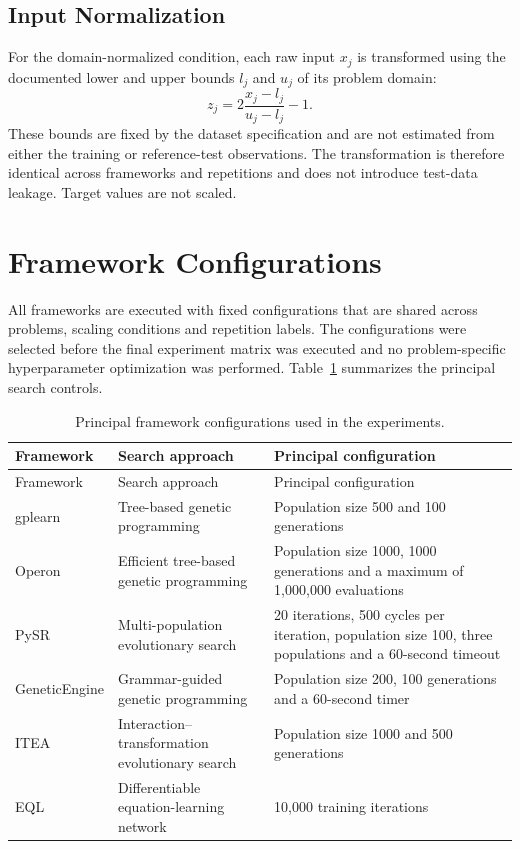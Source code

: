 \documentclass[12pt,oneside,bibtotoc,liststotoc]{scrbook}
\begin{document}
\subsection{Input Normalization}

For the domain-normalized condition, each raw input $x_j$ is transformed using the documented lower and upper bounds $l_j$ and $u_j$ of its problem domain:
\begin{equation}
    z_j = 2\frac{x_j-l_j}{u_j-l_j}-1.
    \label{eq:experiment-domain-scaling}
\end{equation}
These bounds are fixed by the dataset specification and are not estimated from either the training or reference-test observations. The transformation is therefore identical across frameworks and repetitions and does not introduce test-data leakage. Target values are not scaled.

\section{Framework Configurations}

All frameworks are executed with fixed configurations that are shared across problems, scaling conditions and repetition labels. The configurations were selected before the final experiment matrix was executed and no problem-specific hyperparameter optimization was performed. Table~\ref{tab:framework-configurations} summarizes the principal search controls.

\renewcommand{\arraystretch}{1.18}

\begin{longtable}{p{2.5cm}p{3.8cm}p{7.4cm}}
\caption{Principal framework configurations used in the experiments.}
\label{tab:framework-configurations}\\
\toprule
Framework & Search approach & Principal configuration \\
\midrule
\endfirsthead

\toprule
Framework & Search approach & Principal configuration \\
\midrule
\endhead

gplearn & Tree-based genetic programming & Population size 500 and 100 generations \\[0.25em]
Operon & Efficient tree-based genetic programming & Population size 1000, 1000 generations and a maximum of 1,000,000 evaluations \\[0.25em]
PySR & Multi-population evolutionary search & 20 iterations, 500 cycles per iteration, population size 100, three populations and a 60-second timeout \\[0.25em]
GeneticEngine & Grammar-guided genetic programming & Population size 200, 100 generations and a 60-second timer \\[0.25em]
ITEA & Interaction--transformation evolutionary search & Population size 1000 and 500 generations \\[0.25em]
EQL & Differentiable equation-learning network & 10,000 training iterations \\
\bottomrule
\end{longtable}
\end{document}
